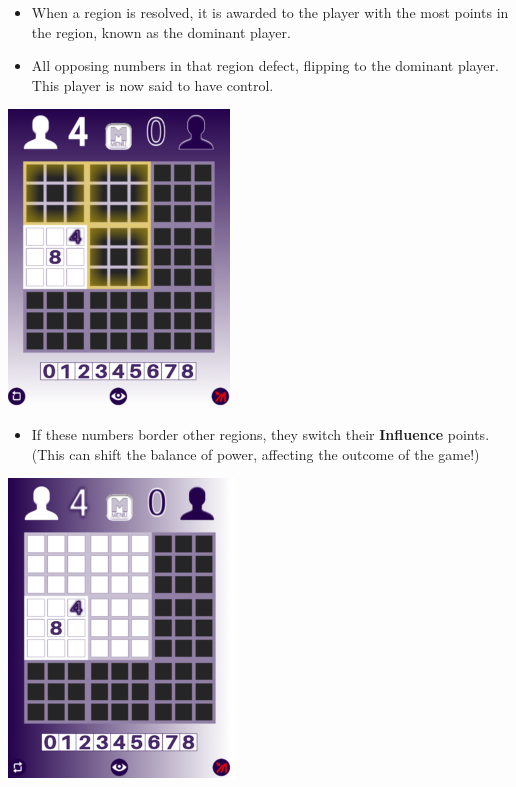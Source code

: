 \documentclass[a4paper]{article}
\begin{document}
\begin{itemize}
    \item When a region is resolved, it is awarded to the player with the most points in the region, known as the dominant player.
    \item All opposing numbers in that region defect, flipping to the dominant player. This player is now said to have control.
\end{itemize}
\begin{center}
    \includegraphics[scale=0.5]{img/tutorial_5.png}
\end{center}

\begin{itemize}
    \item If these numbers border other regions, they switch their \textbf{Influence} points. (This can shift the balance of power, 
    affecting the outcome of the game!)
\end{itemize}
\begin{center}
    \includegraphics[scale=0.5]{img/tutorial_6.png}
\end{center}
\end{document}
